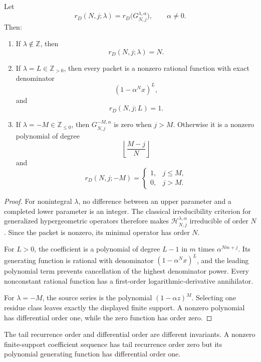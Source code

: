 \begin{theorem}
\label{thm:block09-order-phase}
Let
\[
 r_D(N,j;\lambda)
 =
 r_D\bigl(G_{N,j}^{\lambda,\alpha}\bigr),
 \qquad \alpha\neq0.
\]
Then:

\begin{enumerate}
\item If $\lambda\notin\mathbb Z$, then
\[
 \boxed{r_D(N,j;\lambda)=N.}
\]
\item If $\lambda=L\in\mathbb Z_{>0}$, then every packet is a nonzero rational function with exact denominator
\[
 (1-\alpha^Nx)^L,
\]
and
\[
 \boxed{r_D(N,j;L)=1.}
\]
\item If $\lambda=-M\in\mathbb Z_{\leq0}$, then $G_{N,j}^{-M,\alpha}$ is zero when $j>M$.  Otherwise it is a nonzero polynomial of degree
\[
 \left\lfloor\frac{M-j}{N}\right\rfloor
\]
and
\[
 \boxed{
 r_D(N,j;-M)
 =
 \begin{cases}
 1,&j\leq M,\\
 0,&j>M.
 \end{cases}}
\]
\end{enumerate}
\end{theorem}

\begin{proof}
For nonintegral $\lambda$, no difference between an upper parameter and a completed lower parameter is an integer.  The classical irreducibility criterion for generalized hypergeometric operators therefore makes $\mathcal H_{N,j}^{\lambda,\alpha}$ irreducible of order $N$ \cite{BeukersHeckman1989}.  Since the packet is nonzero, its minimal operator has order $N$.

For $L>0$, the coefficient is a polynomial of degree $L-1$ in $m$ times $\alpha^{Nm+j}$.  Its generating function is rational with denominator $(1-\alpha^Nx)^L$, and the leading polynomial term prevents cancellation of the highest denominator power.  Every nonconstant rational function has a first-order logarithmic-derivative annihilator.

For $\lambda=-M$, the source series is the polynomial $(1-\alpha z)^M$.  Selecting one residue class leaves exactly the displayed finite support.  A nonzero polynomial has differential order one, while the zero function has order zero.
\end{proof}

The tail recurrence order and differential order are different invariants.  A nonzero finite-support coefficient sequence has tail recurrence order zero but its polynomial generating function has differential order one.

